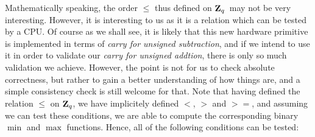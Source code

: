 \documentclass{article}
\newcommand{\zq}{\mbox{${\bf Z}_{q}$}}
\begin{document}
Mathematically speaking, the order $\leq$ thus defined on \zq\ may 
not be very interesting. However, it is interesting to us as it is 
a relation which can be tested by a CPU. Of course as we shall see,
it is likely that this new hardware primitive is implemented in 
terms of {\em carry for unsigned subtraction}, and if we intend
to use it in order to validate our {\em carry for unsigned addtion},
there is only so much validation we achieve. However, the point
is not for us to check absolute correctness, but rather to gain
a better understanding of how things are, and a simple consistency
check is still welcome for that. Note that having defined the 
relation $\leq$ on \zq, we have implicitely defined $<$, $>$ and 
$>=$, and assuming we can test these conditions, we are able 
to compute the corresponding binary $\min$ and $\max$ functions. Hence,
all of the following conditions can be tested:
\end{document}
